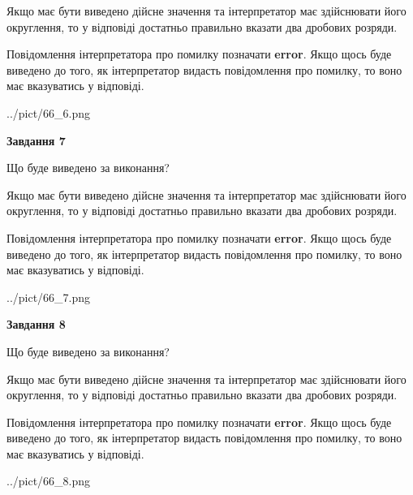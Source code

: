 \documentclass[12pt, ukrainian]{article}
\begin{document}
{\begin {Large}
Якщо має бути виведено дійсне значення та інтерпретатор має здійснювати його округлення, 
то у відповіді достатньо правильно вказати два дробових розряди.

Повідомлення інтерпретатора про помилку позначати \textbf{error}.
Якщо щось буде виведено до того, як інтерпретатор видасть повідомлення про помилку, 
то воно має вказуватись у відповіді. \par

\begin{center}
	{../pict/66_6.png}
\end{center}
\newpage

{\begin {center}\textbf{Завдання 7}\end {center}}\par
Що буде виведено за виконання? \par

Якщо має бути виведено дійсне значення та інтерпретатор має здійснювати його округлення, 
то у відповіді достатньо правильно вказати два дробових розряди.

Повідомлення інтерпретатора про помилку позначати \textbf{error}.
Якщо щось буде виведено до того, як інтерпретатор видасть повідомлення про помилку, 
то воно має вказуватись у відповіді. \par

\begin{center}
	{../pict/66_7.png}
\end{center}
\newpage

{\begin {center}\textbf{Завдання 8}\end {center}}\par
Що буде виведено за виконання? \par

Якщо має бути виведено дійсне значення та інтерпретатор має здійснювати його округлення, 
то у відповіді достатньо правильно вказати два дробових розряди.

Повідомлення інтерпретатора про помилку позначати \textbf{error}.
Якщо щось буде виведено до того, як інтерпретатор видасть повідомлення про помилку, 
то воно має вказуватись у відповіді. \par

\begin{center}
	{../pict/66_8.png}
\end{center}
\newpage


\end{Large}}
\end{document}
